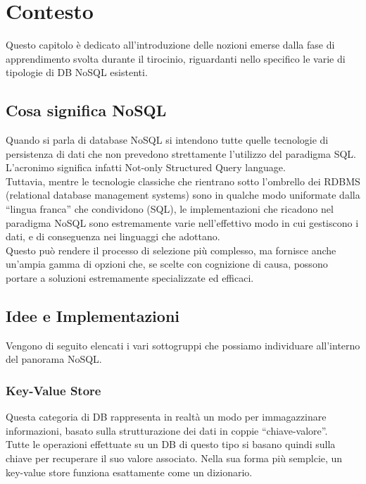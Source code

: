 
\chapter{Contesto}
\label{cap:contesto}

Questo capitolo è dedicato all'introduzione delle nozioni emerse dalla fase di apprendimento svolta durante il tirocinio, riguardanti nello specifico le varie di tipologie di DB NoSQL esistenti.\\

\section{Cosa significa NoSQL}
Quando si parla di database NoSQL si intendono tutte quelle tecnologie di persistenza di dati che non prevedono strettamente l'utilizzo del paradigma SQL. L'acronimo significa infatti Not-only Structured Query language.\\
Tuttavia, mentre le tecnologie classiche che rientrano sotto l'ombrello dei RDBMS (relational database management systems) sono in qualche modo uniformate dalla ``lingua franca'' che condividono (SQL), le implementazioni che ricadono nel paradigma NoSQL sono estremamente varie nell'effettivo modo in cui gestiscono i dati, e di conseguenza nei linguaggi che adottano.\\
Questo può rendere il processo di selezione più complesso, ma fornisce anche un'ampia gamma di opzioni che, se scelte con cognizione di causa, possono portare a soluzioni estremamente specializzate ed efficaci.\\


\section{Idee e Implementazioni}
Vengono di seguito elencati i vari sottogruppi che possiamo individuare all'interno del panorama NoSQL.\\

\subsection{Key-Value Store}
Questa categoria di DB rappresenta in realtà un modo per immagazzinare informazioni, basato sulla strutturazione dei dati in coppie ``chiave-valore''.\\
Tutte le operazioni effettuate su un DB di questo tipo si basano quindi sulla chiave per recuperare il suo valore associato. Nella sua forma più semplcie, un key-value store funziona esattamente come un dizionario.\\

